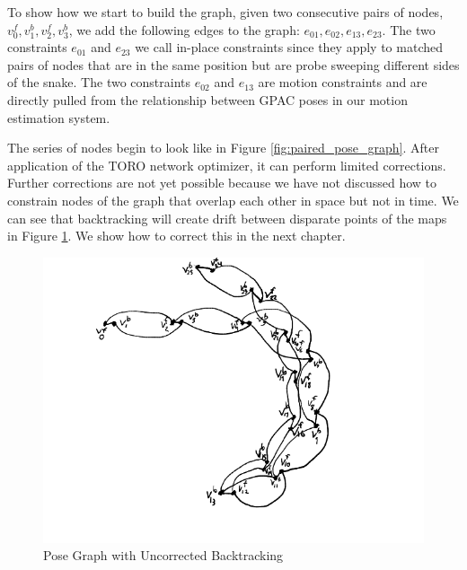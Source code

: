 
To show how we start to build the graph, given two consecutive pairs of nodes, $v^f_0, v^b_1, v^f_2, v^b_3$, we add the following edges to the graph: $e_{01}, e_{02}, e_{13}, e_{23}$.  The two constraints $e_{01}$ and $e_{23}$ we call in-place constraints since they apply to matched pairs of nodes that are in the same position but are probe sweeping different sides of the snake.  The two constraints $e_{02}$ and $e_{13}$ are motion constraints and are directly pulled from the relationship between GPAC poses in our motion estimation system.

The series of nodes begin to look like in Figure \ref{fig:paired_pose_graph}.  After application of the TORO network optimizer, it can perform limited corrections.   Further corrections are not yet possible because we have not discussed how to constrain nodes of the graph that overlap each other in space but not in time.  We can see that backtracking will create drift between disparate points of the maps in Figure \ref{fig:backtrack_pose_graph}.  We show how to correct this in the next chapter.

\begin{figure}
  \begin{center}
    \includegraphics[scale=0.7]{5_pose_graph_backtrack.png}
  \end{center}
  \caption{Pose Graph with Uncorrected Backtracking}
	\label{fig:backtrack_pose_graph}
\end{figure}

